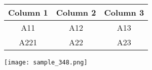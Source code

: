 \documentclass{article}
\begin{document}
\begin{table}[h]
    \centering
    \begin{tabular}{|c|c|c|}
        \hline
        Column 1 & Column 2 & Column 3 \\
        \hline
        A11 & A12 & A13 \\
        \hline
        A221 & A22 & A23 \\
        \hline
    \end{tabular}
\end{table}

\begin{minipage}{\textwidth}
    \begin{center}
        \texttt{[image: sample\_348.png]}
    \end{center}
\end{minipage}
\end{document}
